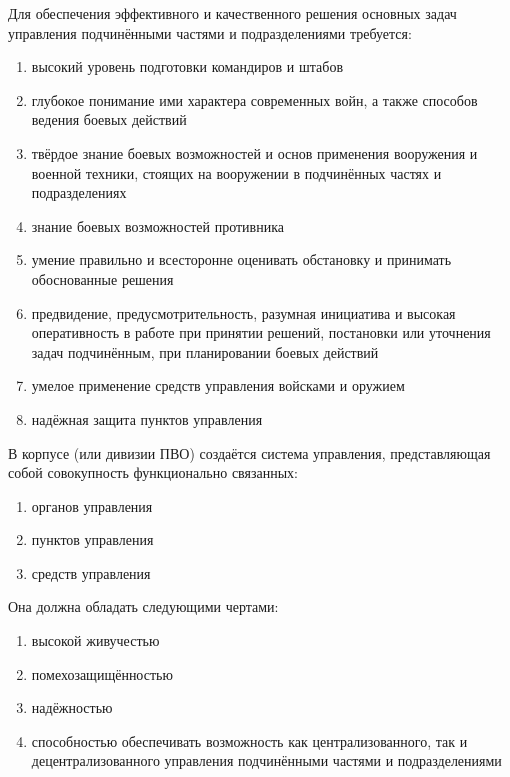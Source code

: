 \documentclass[a4paper,12pt]{article}
\begin{document}
	Для обеспечения эффективного и качественного решения основных задач управления подчинёнными
частями и подразделениями требуется:
	\begin{enumerate}
		\item высокий уровень подготовки командиров и штабов
		\item глубокое понимание ими характера современных войн, а также способов ведения 
		боевых действий
		\item твёрдое знание боевых возможностей и основ применения вооружения и военной 
		техники, стоящих на вооружении в подчинённых частях и подразделениях
		\item знание боевых возможностей противника
		\item умение правильно и всесторонне оценивать обстановку и принимать обоснованные решения
		\item предвидение, предусмотрительность, разумная инициатива и высокая оперативность
		в работе при принятии решений, постановки или уточнения задач подчинённым, при 
		планировании боевых действий
		\item умелое применение средств управления войсками и оружием
		\item надёжная защита пунктов управления
	\end{enumerate}
	В корпусе (или дивизии ПВО) создаётся система управления, представляющая собой совокупность
функционально связанных:
	\begin{enumerate}
		\item органов управления
		\item пунктов управления
		\item средств управления
	\end{enumerate}
	Она должна обладать следующими чертами:
	\begin{enumerate}
		\item высокой живучестью
		\item помехозащищённостью
		\item надёжностью
		\item способностью обеспечивать возможность как централизованного, так и 
		децентрализованного управления подчинёнными частями и подразделениями
	\end{enumerate}
\end{document}
